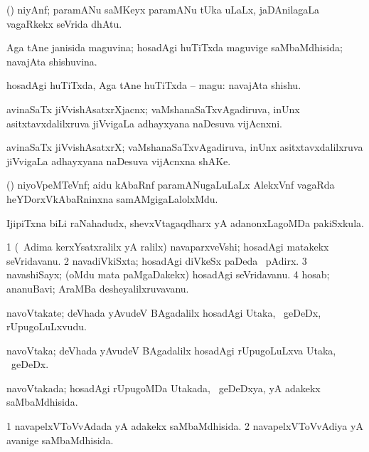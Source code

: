 \bentry
{}
\gl{\nA}
\bmng
(\ravi) niyAnf; paramANu saMKeyx  paramANu tUka  uLaLx, jaDAnilagaLa vagaRkekx seVrida dhAtu. 
\emng
\eentry

\bentry
{}
\gl{\gu}
\bmng
Aga tAne janisida maguvina; hosadAgi huTiTxda maguvige saMbaMdhisida; navajAta shishuvina. 
\emng
\eentry

\bentry
{}
\gl{\nA}
\bmng
hosadAgi huTiTxda, Aga tAne huTiTxda -- magu: navajAta shishu. 
\emng
\eentry

\bentry
{}
\gl{\nA}
\bmng
avinaSaTx jiVvishAsatxrXjacnx; vaMshanaSaTxvAgadiruva, inUnx asitxtavxdalilxruva jiVvigaLa adhayxyana naDesuva vijAcnxni. 
\emng
\eentry

\bentry
{}
\gl{\nA}
\bmng
avinaSaTx jiVvishAsatxrX; vaMshanaSaTxvAgadiruva, inUnx asitxtavxdalilxruva jiVvigaLa adhayxyana naDesuva vijAcnxna shAKe. 
\emng
\eentry

\bentry
{}
\bmng
(\ravi) niyoVpeMTeVnf; aidu kAbaRnf paramANugaLuLaLx AlekxVnf vagaRda heYDorxVkAbaRninxna samAMgigaLalolxMdu. 
\emng
\eentry

\bentry
{}
\gl{\nA}
\bmng
IjipiTxna biLi raNahadudx, shevxVtagaqdharx yA adanonxLagoMDa pakiSxkula. 
\emng
\eentry

\bentry
{}
\gl{\nA}
\bmng
\bnum
\num{1} (\kanmu\ Adima kerxYsatxralilx yA \roVkAyx ralilx) navaparxveVshi; hosadAgi matakekx seVridavanu. 
\num{2} navadiVkiSxta; hosadAgi diVkeSx paDeda \roVkAyx\ pAdirx. 
\num{3} navashiSayx; (oMdu mata paMgaDakekx) hosadAgi seVridavanu. 
\num{4} hosab; ananuBavi; AraMBa desheyalilxruvavanu. 
\enum
\emng
\eentry

\bentry
{}
\gl{\nA}
\bmng
navoVtakate; deVhada yAvudeV BAgadalilx hosadAgi Utaka, \kanmu\ geDeDx, rUpugoLuLxvudu. 
\emng
\eentry

\bentry
{}
\gl{\nA}
\bmng
navoVtaka; deVhada yAvudeV BAgadalilx hosadAgi rUpugoLuLxva Utaka, \kanmu\ geDeDx. 
\emng
\eentry

\bentry
{}
\gl{\gu}
\bmng
navoVtakada; hosadAgi rUpugoMDa Utakada, \kanmu\ geDeDxya, yA adakekx saMbaMdhisida. 
\emng
\eentry

\bentry
{}
\gl{\gu}
\bmng
\bnum
\num{1} navapelxVToVvAdada yA adakekx saMbaMdhisida. 
\num{2} navapelxVToVvAdiya yA avanige saMbaMdhisida. 
\enum
\emng
\eentry

